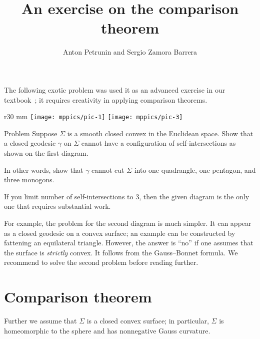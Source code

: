 \documentclass[oneside,a4paper]{amsart}
\begin{document}
\title{An exercise on the comparison theorem}
\author{Anton Petrunin and Sergio Zamora Barrera}

\maketitle

The following exotic problem was used it as an advanced exercise in our textbook~\cite{petrunin-zamora};
it requires creativity in applying comparison theorems.

{

\begin{wrapfigure}{r}{30 mm}
\vskip-4mm
\centering
\texttt{[image: mppics/pic-1]}
\bigskip
\texttt{[image: mppics/pic-3]}
\end{wrapfigure}

\begin{thm}{Problem}
Suppose $\Sigma$ is a smooth closed convex in the Euclidean space. 
Show that a closed geodesic $\gamma$ on $\Sigma$ cannot have a configuration of self-intersections as shown on the first diagram.

In other words, show that $\gamma$ cannot cut $\Sigma$ into one quadrangle, one pentagon, and three monogons.
\end{thm}

If you limit number of self-intersections to 3, then the given diagram is the only one that requires substantial work.

For example, the problem for the second diagram is much simpler.
It can appear as a closed geodesic on a convex surface;
an example can be constructed by fattening an equilateral triangle.
However, the answer is ``no'' if one assumes that the surface is \emph{strictly} convex. 
It follows from the Gauss--Bonnet formula.
We recommend to solve the second problem before reading further.

}

\section*{Comparison theorem}

Further we assume that $\Sigma$ is a closed convex surface;
in particular, $\Sigma$ is homeomorphic to the sphere and has nonnegative Gauss curvature.
\end{document}
